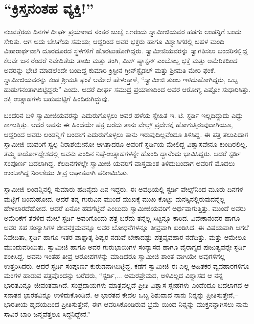 
\chapter{“ಕ್ರಿಸ್ತನಂತಹ ವ್ಯಕ್ತಿ!”}

\noindent

ನಲವತ್ತೆರಡು ದಿನಗಳ ದೀರ್ಘ ಪ್ರಯಾಣದ ನಂತರ ಜುಲೈ ೩೧ರಂದು ಸ್ವಾಮೀಜಿಯವರ ಹಡಗು ಲಂಡನ್ನಿಗೆ ಬಂದು ಸೇರಿತು. ಆಗ ಅದು ಬೇಸಿಗೆಯ ಸಮಯ; ಆದ್ದರಿಂದ ಅವರ ಭಕ್ತರು ಹಾಗೂ ವಿಶ್ವಾಸಿಗರಲ್ಲಿ ಬಹಳ ಮಂದಿ ವಿಹಾರಾರ್ಥವಾಗಿ ದೂರದೂರದ ಸ್ಥಳಗಳಿಗೆ ಹೊರಟುಹೋಗಿದ್ದರು. ಸ್ವಾಮೀಜಿಯವರನ್ನು ಸ್ವಾಗತಿಸಲು ಬಂದರಿನಲ್ಲಿದ್ದ ಕೆಲವೇ ಜನ ರೆಂದರೆ ನಿವೇದಿತೆಯ ತಾಯಿ ಮತ್ತು ತಂಗಿ, ಮಿಸ್ ಪ್ಯಾಸ್ಟನ್ ಎಂಬೊಬ್ಬ ಭಕ್ತೆ ಮತ್ತು ಅಮೆರಿಕದಿಂದ ಅವರನ್ನು ಭೇಟಿ ಮಾಡಲೆಂದೇ ಬಂದಿದ್ದ ಕುಮಾರಿ ಕ್ರಿಸ್ಟೀನ ಗ್ರೀನ್​ಸ್ಟೈಡಲ್ ಮತ್ತು ಶ್ರೀಮತಿ ಮೇರಿ ಫಂಕೆ. ಸ್ವಾಮೀಜಿಯವರನ್ನು ಕಂಡ ಶ್ರೀಮತಿ ಫಂಕೆ ಆಮೇಲೆ ಹೇಳುತ್ತಾಳೆ, “ಸ್ವಾಮೀಜಿ ತುಂಬ ಇಳಿದುಹೋಗಿದ್ದರು, ಒಬ್ಬ ಹುಡುಗನಂತಾಗಿಬಿಟ್ಟಿದ್ದರು” ಎಂದು. ಆದರೆ ದೀರ್ಘ ಸಮುದ್ರ ಪ್ರಯಾಣದಿಂದ ಅವರ ಆರೋಗ್ಯ ಎಷ್ಟೋ ಸುಧಾರಿಸಿತ್ತು. ಶಕ್ತಿ ಉತ್ಸಾಹಗಳು ಬಹುಮಟ್ಟಿಗೆ ಹಿಂದಿರುಗಿದ್ದುವು.

ಬಂದರಿನ ಬಳಿ ಸ್ವಾಮೀಜಿಯವರನ್ನು ಎದುರುಗೊಳ್ಳಲು ಅವರ ಹಳೆಯ ಸ್ನೇಹಿತ ಇ. ಟಿ. ಸ್ಟರ್ಡಿ ಇಲ್ಲದಿದ್ದುದು ಎದ್ದು ಕಾಣುತ್ತಿತ್ತು. ಆದರೆ ಅವನು ಈ ಹಿಂದೆಯೇ ಪತ್ರ ಬರೆದು ತಾನು ವೇಲ್ಸ್ ಪ್ರದೇಶಕ್ಕೆ ಹೋಗುತ್ತಿರುವುದಾಗಿಯೂ, ಆದ್ದರಿಂದ ಅವರು ಲಂಡನ್ನಿಗೆ ಬಂದಾಗ ಎದುರುಗೊಳ್ಳಲು ತಾನು ಇರುವುದಿಲ್ಲವೆಂದೂ ತಿಳಿಸಿದ್ದ. ಈ ಪತ್ರ ತಲುಪಿದಾಗ ಸ್ವಾಮೀಜಿ ಯವರಿಗೆ ಸ್ವಲ್ಪ ನಿರಾಶೆಯೇನೋ ಆಗಿತ್ತಾದರೂ ಅವರಿಗೆ ಸ್ಟರ್ಡಿಯ ಮೇಲಿದ್ದ ವಿಶ್ವಾಸವೇನೂ ಕುಂದಿರಲಿಲ್ಲ. ತಮ್ಮ ಕಾರ್ಯೋದ್ದೇಶದಲ್ಲಿ ಅವನು ಎಂದಿನ ನಿಷ್ಠೆ-ಉತ್ಸಾಹಗಳನ್ನೇ ಹೊಂದಿ ದ್ದಾನೆಂದು ಭಾವಿಸಿದ್ದರು. ಆದರೆ ಸ್ಟರ್ಡಿ ಸಂಪೂರ್ಣ ಬದಲಾಗಿದ್ದ. ಕೆಲದಿನಗಳಲ್ಲೇ ಸ್ವಾಮೀಜಿ ಯವರಿಗೆ ವಾಸ್ತವಾಂಶ ತಿಳಿದುಬಂದಾಗ ಅವರಿಗೆ ಮೊದಲು ಉಂಟಾಗಿದ್ದ ನಿರಾಶೆಯು ತೀವ್ರ ಆಘಾತವಾಗಿ ಪರಿಣಮಿಸಿತು.

ಸ್ವಾಮೀಜಿ ಲಂಡನ್ನಿನಲ್ಲಿ ಸುಮಾರು ಹದಿನೈದು ದಿನ ಇದ್ದರು. ಈ ಅವಧಿಯಲ್ಲಿ ಸ್ಟರ್ಡಿ ವೇಲ್ಸ್​ನಿಂದ ಮೂರು ದಿನಗಳ ಮಟ್ಟಿಗೆ ಬಂದುಹೋದ. ಆದರೆ ತನ್ನ ಗುರುವಿನ ಮುಂದೆ ಮುಖಕ್ಕೆ ಮುಖ ಕೊಟ್ಟು ಮನಸ್ಸಿನಲ್ಲಿರುವುದನ್ನೆಲ್ಲ ಹೇಳಲಾರದೆಹೋದ. ಆದರೆ ಏನೋ ಹದಗೆಟ್ಟಿದೆ ಎಂಬುದು ಸ್ವಾಮೀಜಿಯವರಿಗೆ ಅರ್ಥವಾಗುತ್ತಿತ್ತು. ಮುಂದೆ ಅವರು ಅಮೆರಿಕೆಗೆ ತೆರಳಿದ ಮೇಲೆ ಸ್ಟರ್ಡಿ ಅವರಿಗೊಂದು ಪತ್ರ ಬರೆದು ತನ್ನೆಲ್ಲ ಸಿಟ್ಟನ್ನೂ ಕಾರಿದ. ವಿವೇಕಾನಂದರ ಹಾಗೂ ಅವರ ಸಹ ಸಂನ್ಯಾಸಿಗಳ ಜೀವನಕ್ರಮವನ್ನೂ ಅವರ ಬೋಧನೆಗಳನ್ನೂ ತೀವ್ರವಾಗಿ ಖಂಡಿಸಿದ. ಈ ವಿಷಯವಾಗಿ ಆಗಲೆ ನಿವೇದಿತಾ, ಸ್ಟರ್ಡಿ ಹಾಗೂ ಇತರ ಪಾಶ್ಚಾತ್ಯ ಶಿಷ್ಯರ ನಡುವೆ ಬೇಕಾದಷ್ಟು ಪತ್ರವ್ಯವಹಾರ ನಡೆದಿತ್ತು. ಮತ್ತು ಆಮೇಲೂ ಮುಂದುವರಿಯಿತು. ಸ್ವಾಮೀಜಿ ಹಾಗೂ ಅವರ ಗುರುಭಾಯಿಗಳ ಸಂನ್ಯಾಸದ ಹಾಗೂ ವೈರಾಗ್ಯದ ಪುಜುತ್ವವನ್ನೇ ಸ್ಟರ್ಡಿ ಶಂಕಿಸಿದ್ದ. ಅವನು ಇಂತಹ ತೀವ್ರ ಆರೋಪಗಳನ್ನು ಮಾಡಿದರೂ ಸ್ವಾಮೀಜಿ ಶಾಂತ ವಾಗಿಯೇ ಅವುಗಳಿಗೆಲ್ಲ ಉತ್ತರಿಸಿದರು. ಆದರೆ ಸ್ಟರ್ಡಿ ಸಂಪೂರ್ಣ ಕುರುಡನಾಗಿಬಿಟ್ಟಿದ್ದ. ಕಡೆಗೆ ಸ್ವಾಮೀಜಿ ಈ ಎಲ್ಲ ಅಹಿತಕರ ವ್ಯವಹಾರಗಳಿಗೂ ಮಂಗಳ ಹಾಡುವ ಪತ್ರವೊಂದನ್ನು ಬರೆದರು, “ಸ್ಟರ್ಡಿ,... ಅಮರಪ್ರೇಮದ, ಅಳಿವಿಲ್ಲದ ವಿಶ್ವಾಸದ ಆ ನನ್ನ ಭಾರತವಿನ್ನೂ ಜೀವಂತವಾಗಿದೆ. ಸಂಪ್ರದಾಯಗಳು ಮಾತ್ರವಲ್ಲದೆ ಪ್ರೀತಿ ವಿಶ್ವಾಸ ಸ್ನೇಹಗಳು ಎಂದೆಂದೂ ಬದಲಾಗದ ಆ ಸನಾತನ ಭಾರತವಿನ್ನೂ ಉಳಿದುಕೊಂಡಿದೆ. ಆ ಭಾರತದ ಕೇವಲ ಒಬ್ಬ ಶಿಶುವಾದ ನಾನು ನಿನ್ನನ್ನು ಪ್ರೀತಿಸುತ್ತೇನೆ,–ಭಾರತೀಯ ಹೃದಯದಿಂದ ಪ್ರೀತಿಸುತ್ತೇನೆ, ಈಗ ಆವರಿಸಿಕೊಂಡಿರುವ ಭ್ರಮೆ ಯಿಂದ ನಿನ್ನನ್ನು ಮುಕ್ತನನ್ನಾಗಿಸಲು ನಾನು ಸಾವಿರ ಬಾರಿ ಜನ್ಮವೆತ್ತಲೂ ಸಿದ್ಧನಿದ್ದೇನೆ.”

